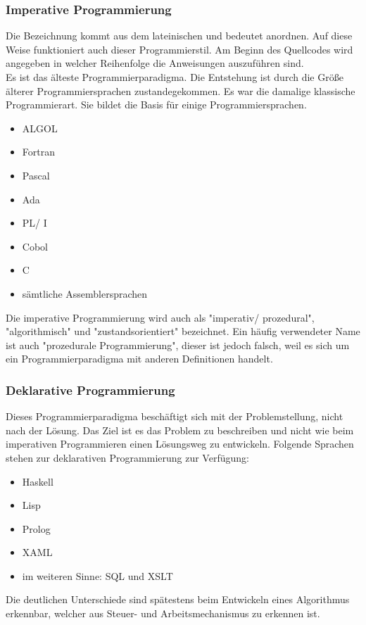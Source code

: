 \documentclass[12pt,a4paper]{report}
\begin{document}
\begin{onehalfspace}
\subsubsection{Imperative Programmierung}
Die Bezeichnung kommt aus dem lateinischen und bedeutet anordnen. Auf diese Weise funktioniert auch dieser Programmierstil. Am Beginn des Quellcodes wird angegeben in welcher Reihenfolge die Anweisungen auszuführen sind.\\

Es ist das älteste Programmierparadigma. Die Entstehung ist durch die Größe älterer Programmiersprachen zustandegekommen. Es war die damalige klassische Programmierart. Sie bildet die Basis für einige Programmiersprachen.
\begin{itemize}
\item ALGOL
\item Fortran
\item Pascal
\item Ada
\item PL/ I
\item Cobol
\item C
\item sämtliche Assemblersprachen
\end{itemize}
Die imperative Programmierung wird auch als "{}imperativ/ prozedural"{}, "{}algorithmisch"{} und "{}zustandsorientiert"{} bezeichnet. Ein häufig verwendeter Name ist auch "{}prozedurale Programmierung"{}, dieser ist jedoch falsch, weil es sich um ein Programmierparadigma mit anderen Definitionen handelt.

\subsubsection{Deklarative Programmierung}
Dieses Programmierparadigma beschäftigt sich mit der Problemstellung, nicht nach der Lösung. Das Ziel ist es das Problem zu beschreiben und nicht wie beim imperativen Programmieren einen Lösungsweg zu entwickeln.
Folgende Sprachen stehen zur deklarativen Programmierung zur Verfügung:
\begin{itemize}
\item Haskell
\item Lisp
\item Prolog
\item XAML
\item im weiteren Sinne: SQL und XSLT
\end{itemize} 
Die deutlichen Unterschiede sind spätestens beim Entwickeln eines Algorithmus erkennbar, welcher aus Steuer- und Arbeitsmechanismus zu erkennen ist.\\


\end{onehalfspace}
\end{document}
